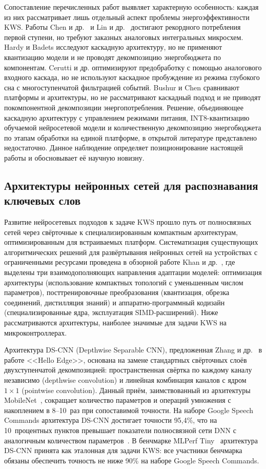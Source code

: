 Сопоставление перечисленных работ выявляет характерную особенность:
каждая из них рассматривает лишь отдельный аспект проблемы
энергоэффективности KWS. Работы Chen и др.~\cite{src:29} и Lin и
др.~\cite{src:30} достигают рекордного потребления первой ступени, но
требуют заказных аналоговых интегральных микросхем. Hardy и Badets
исследуют каскадную архитектуру, но не применяют квантизацию модели и не
проводят декомпозицию энергобюджета по компонентам. Cerutti и др.
оптимизируют предобработку с помощью аналогового входного каскада, но не
используют каскадное пробуждение из режима глубокого сна с многоступенчатой
фильтрацией событий. Bushur и Chen сравнивают платформы и архитектуры,
но не рассматривают каскадный подход и не приводят покомпонентной
декомпозиции энергопотребления. Решение, объединяющее каскадную
архитектуру с управлением режимами питания, INT8-квантизацию обучаемой
нейросетевой модели и количественную декомпозицию энергобюджета по
этапам обработки на единой платформе, в открытой литературе представлено
недостаточно. Данное наблюдение определяет позиционирование настоящей
работы и обосновывает её научную новизну.

\subsection{Архитектуры нейронных сетей для распознавания ключевых слов}

Развитие нейросетевых подходов к задаче KWS прошло путь от полносвязных
сетей через свёрточные к специализированным компактным архитектурам,
оптимизированным для встраиваемых платформ. Систематизация существующих
алгоритмических решений для развёртывания нейронных сетей на устройствах
с ограниченными ресурсами проведена в обзорной работе Khan и
др.~\cite{src:27}, где выделены три взаимодополняющих направления
адаптации моделей: оптимизация архитектуры (использование компактных
топологий с уменьшенным числом параметров), посттренировочные
преобразования (квантизация, обрезка соединений, дистилляция знаний) и
аппаратно-программный кодизайн (специализированные ядра, эксплуатация
SIMD-расширений). Ниже рассматриваются архитектуры, наиболее значимые
для задачи KWS на микроконтроллерах.

Архитектура DS-CNN (Depthwise Separable CNN), предложенная Zhang и
др.~\cite{src:1} в работе <<Hello Edge>>, основана на замене стандартных
свёрточных слоёв двухступенчатой декомпозицией: пространственная свёртка
по каждому каналу независимо (depthwise convolution) и линейная
комбинация каналов с ядром $1 \times 1$ (pointwise convolution). Данный
приём, заимствованный из архитектуры MobileNet~\cite{src:11}, сокращает
количество параметров и операций умножения с накоплением в 8--10~раз при
сопоставимой точности. На наборе Google Speech Commands архитектура
DS-CNN достигает точности 95,4\%, что на 10~процентных пунктов
превышает показатели полносвязной сети DNN с аналогичным количеством
параметров~\cite{src:1}. В бенчмарке MLPerf Tiny~\cite{src:5}
архитектура DS-CNN принята как эталонная для задачи KWS: все участники
бенчмарка обязаны обеспечить точность не ниже 90\% на наборе Google
Speech Commands.

